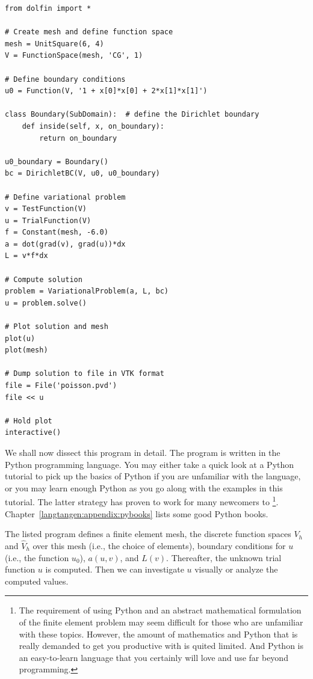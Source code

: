 \begin{Verbatim}[fontsize=\fontsize{10pt}{10pt},tabsize=8,baselinestretch=1.05,
fontfamily=tt,xleftmargin=7mm]
from dolfin import *

# Create mesh and define function space
mesh = UnitSquare(6, 4)
V = FunctionSpace(mesh, 'CG', 1)

# Define boundary conditions
u0 = Function(V, '1 + x[0]*x[0] + 2*x[1]*x[1]')

class Boundary(SubDomain):  # define the Dirichlet boundary
    def inside(self, x, on_boundary):
        return on_boundary

u0_boundary = Boundary()
bc = DirichletBC(V, u0, u0_boundary)

# Define variational problem
v = TestFunction(V)
u = TrialFunction(V)
f = Constant(mesh, -6.0)
a = dot(grad(v), grad(u))*dx
L = v*f*dx

# Compute solution
problem = VariationalProblem(a, L, bc)
u = problem.solve()

# Plot solution and mesh
plot(u)
plot(mesh)

# Dump solution to file in VTK format
file = File('poisson.pvd')
file << u

# Hold plot
interactive()
\end{Verbatim}
\noindent

We shall now dissect this \fenics{} program in detail. The program
is written in the Python programming language.
You may either take a quick look at a Python tutorial \cite{Rossumothers2009TuIngebrigtsenMorganFaulderEtAl2004ial}
to pick up the basics of Python if you are unfamiliar with the language,
or you may learn enough Python as you go along with the examples in this
tutorial. The latter strategy has proven to work for many newcomers
to \fenics\footnote{The requirement of using Python and an abstract
mathematical formulation of the finite element problem may seem
difficult for those who are unfamiliar with these topics.
However, the amount of mathematics and Python that is really demanded
to get you productive with \fenics{} is quited limited.
And Python is an easy-to-learn language that you certainly will love
and use far beyond \fenics{} programming.}.
Chapter~\ref{langtangen:appendix:pybooks} lists some good Python books.

The listed \fenics{} program defines a finite element mesh, the discrete
function spaces $V_h$ and $\hat{V}_h$ over this mesh (i.e., the choice
of elements), boundary conditions
for $u$ (i.e., the function $u_0$), $a(u,v)$, and $L(v)$.
Thereafter, the unknown
trial function $u$ is computed. Then we can investigate $u$ visually or
analyze the computed values.

